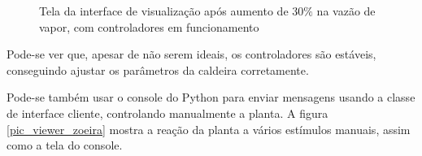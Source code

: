 \begin{figure}[H]
  \caption{\label{pic_viewer_controllers} Tela da interface de
    visualização após aumento de $30\%$ na vazão de vapor, com
    controladores em funcionamento}
  \centering

\end{figure}

Pode-se ver que, apesar de não serem ideais, os controladores são
estáveis, conseguindo ajustar os parâmetros da caldeira corretamente.

Pode-se também usar o console do Python para enviar mensagens usando a
classe de interface cliente, controlando manualmente a planta. A
figura \ref{pic_viewer_zoeira} mostra a reação da planta a vários
estímulos manuais, assim como a tela do console.

